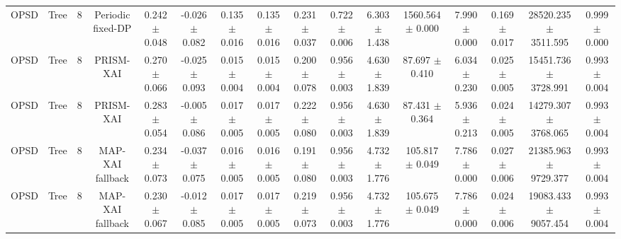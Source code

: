 \begin{tabular}{lccccccccccccccc}
OPSD & Tree & 8 & Periodic fixed-DP & 0.242 $\pm$ 0.048 & -0.026 $\pm$ 0.082 & 0.135 $\pm$ 0.016 & 0.135 $\pm$ 0.016 & 0.231 $\pm$ 0.037 & 0.722 $\pm$ 0.006 & 6.303 $\pm$ 1.438 & 1560.564 $\pm$ 0.000 & 7.990 $\pm$ 0.000 & 0.169 $\pm$ 0.017 & 28520.235 $\pm$ 3511.595 & 0.999 $\pm$ 0.000 \\
OPSD & Tree & 8 & PRISM-XAI & 0.270 $\pm$ 0.066 & -0.025 $\pm$ 0.093 & 0.015 $\pm$ 0.004 & 0.015 $\pm$ 0.004 & 0.200 $\pm$ 0.078 & 0.956 $\pm$ 0.003 & 4.630 $\pm$ 1.839 & 87.697 $\pm$ 0.410 & 6.034 $\pm$ 0.230 & 0.025 $\pm$ 0.005 & 15451.736 $\pm$ 3728.991 & 0.993 $\pm$ 0.004 \\
OPSD & Tree & 8 & PRISM-XAI & 0.283 $\pm$ 0.054 & -0.005 $\pm$ 0.086 & 0.017 $\pm$ 0.005 & 0.017 $\pm$ 0.005 & 0.222 $\pm$ 0.080 & 0.956 $\pm$ 0.003 & 4.630 $\pm$ 1.839 & 87.431 $\pm$ 0.364 & 5.936 $\pm$ 0.213 & 0.024 $\pm$ 0.005 & 14279.307 $\pm$ 3768.065 & 0.993 $\pm$ 0.004 \\
OPSD & Tree & 8 & MAP-XAI fallback & 0.234 $\pm$ 0.073 & -0.037 $\pm$ 0.075 & 0.016 $\pm$ 0.005 & 0.016 $\pm$ 0.005 & 0.191 $\pm$ 0.080 & 0.956 $\pm$ 0.003 & 4.732 $\pm$ 1.776 & 105.817 $\pm$ 0.049 & 7.786 $\pm$ 0.000 & 0.027 $\pm$ 0.006 & 21385.963 $\pm$ 9729.377 & 0.993 $\pm$ 0.004 \\
OPSD & Tree & 8 & MAP-XAI fallback & 0.230 $\pm$ 0.067 & -0.012 $\pm$ 0.085 & 0.017 $\pm$ 0.005 & 0.017 $\pm$ 0.005 & 0.219 $\pm$ 0.073 & 0.956 $\pm$ 0.003 & 4.732 $\pm$ 1.776 & 105.675 $\pm$ 0.049 & 7.786 $\pm$ 0.000 & 0.024 $\pm$ 0.006 & 19083.433 $\pm$ 9057.454 & 0.993 $\pm$ 0.004 \\
\bottomrule
\end{tabular}
